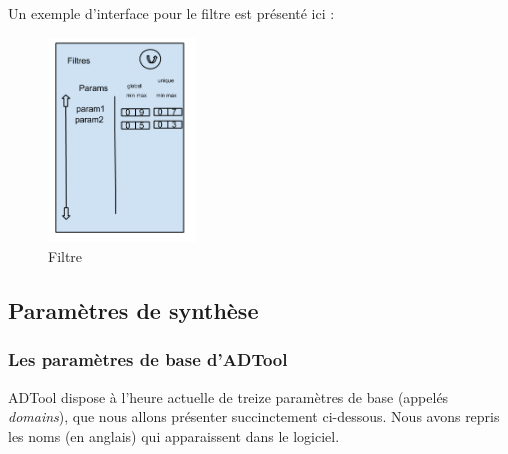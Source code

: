 		Un exemple d'interface pour le filtre est présenté ici :

		\begin{figure}[h!]
			\begin{center}
				\includegraphics[width=0.35\textwidth]{figure/filtre.png}
			\end{center}
			\caption{Filtre}
			\label{fig:filtre}
		\end{figure}

\subsection{Paramètres de synthèse}

\subsubsection{Les paramètres de base d'ADTool}

ADTool dispose à l'heure actuelle de treize paramètres de base (appelés \textit{domains}), que nous allons présenter succinctement ci-dessous. Nous avons repris les noms (en anglais) qui apparaissent dans le logiciel. 
		
